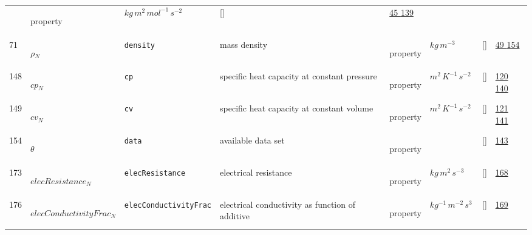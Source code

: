 \begin{longtable}{|p{1cm}|p{3cm}|p{3cm}|p{7cm}|p{3.0cm}|p{3cm}|p{2cm}|p{1cm}|}
             & \begin{lay}property \end{lay}
             & $ kg \,m^{2} \,mol^{-1} \,s^{-2} \, $
             & []
             & \hyperlink{"e:45"}{ 45 }
                 \hyperlink{"e:139"}{ 139 }
                 \\
    71
             & \hypertarget{"v:71"}{ $ {\rho}{_{N}} $}
             & \verb|density|
             & mass density
             & \begin{lay}property \end{lay}
             & $ kg \,m^{-3} \, $
             & []
             & \hyperlink{"e:49"}{ 49 }
                 \hyperlink{"e:154"}{ 154 }
                 \\
    148
             & \hypertarget{"v:148"}{ $ {cp}{_{N}} $}
             & \verb|cp|
             & specific heat capacity at constant pressure
             & \begin{lay}property \end{lay}
             & $ m^{2} \,K^{-1} \,s^{-2} \, $
             & []
             & \hyperlink{"e:120"}{ 120 }
                 \hyperlink{"e:140"}{ 140 }
                 \\
    149
             & \hypertarget{"v:149"}{ $ {cv}{_{N}} $}
             & \verb|cv|
             & specific heat capacity at constant volume
             & \begin{lay}property \end{lay}
             & $ m^{2} \,K^{-1} \,s^{-2} \, $
             & []
             & \hyperlink{"e:121"}{ 121 }
                 \hyperlink{"e:141"}{ 141 }
                 \\
    154
             & \hypertarget{"v:154"}{ $ {\theta}{_{}} $}
             & \verb|data|
             & available data set
             & \begin{lay}property \end{lay}
             & $  $
             & []
             & \hyperlink{"e:143"}{ 143 }
                 \\
    173
             & \hypertarget{"v:173"}{ $ {elecResistance}{_{N}} $}
             & \verb|elecResistance|
             & electrical resistance
             & \begin{lay}property \end{lay}
             & $ kg \,m^{2} \,s^{-3} \, $
             & []
             & \hyperlink{"e:168"}{ 168 }
                 \\
    176
             & \hypertarget{"v:176"}{ $ {elecConductivityFrac}{_{N}} $}
             & \verb|elecConductivityFrac|
             & electrical conductivity as function of additive
             & \begin{lay}property \end{lay}
             & $ kg^{-1} \,m^{-2} \,s^{3} \, $
             & []
             & \hyperlink{"e:169"}{ 169 }
                 \\
    \end{longtable}